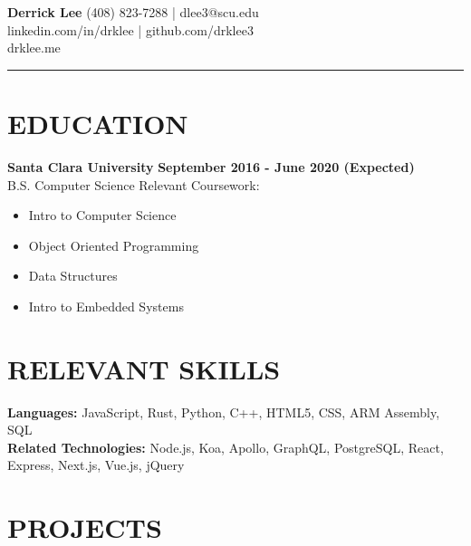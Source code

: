 \documentclass{res}
\begin{document}
	\thispagestyle{empty} %
	{\bf \huge{Derrick Lee}} \hfill {(408) 823-7288 | dlee3@scu.edu} \\
	\hspace*{\fill} {linkedin.com/in/drklee | github.com/drklee3} \\
	\hspace*{\fill} {drklee.me} \\
	\noindent\rule{\textwidth}{1pt}
	\begin{resume}

		\section{EDUCATION}

		{\bf Santa Clara University} \hfill {\bf September 2016 - June 2020 (Expected)} \\
			B.S. Computer Science
			Relevant Coursework:
			\vspace{-3.5mm}
			\begin{multicols}{2}
			\begin{itemize} \itemsep -2pt
				\item Intro to Computer Science
				\item Object Oriented Programming
				\item Data Structures
				\item Intro to Embedded Systems
			\end{itemize}
			\end{multicols}
		
		\section{RELEVANT SKILLS}
		\vspace{6pt}

			{\bf Languages:} JavaScript, Rust, Python, C++, HTML5, CSS, ARM Assembly, SQL \\
			{\bf Related Technologies:} Node.js, Koa, Apollo, GraphQL, PostgreSQL, React, Express, Next.js, Vue.js, jQuery

		\section{PROJECTS} 
		\vspace{6pt}


\end{resume}
\end{document}
